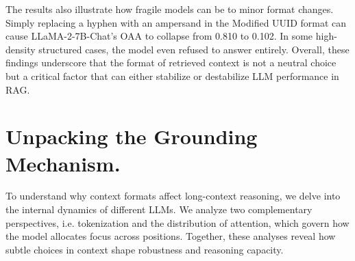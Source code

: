 \documentclass{article} %
\newcommand{\llamachat}{LLaMA-2-7B-Chat}
\begin{document}
The results also illustrate how fragile models can be to minor format changes. Simply replacing a hyphen with an ampersand in the Modified UUID format can cause \llamachat{}’s OAA to collapse from 0.810 to 0.102. In some high-density structured cases, the model even refused to answer entirely.
Overall, these findings underscore that the format of retrieved context is not a neutral choice but a critical factor that can either stabilize or destabilize LLM performance in RAG.

\section{Unpacking the Grounding Mechanism.}
To understand why context formats affect long-context reasoning, we delve into the internal dynamics of different LLMs. 
We analyze two complementary perspectives, i.e. tokenization and the distribution of attention, which govern how the model allocates focus across positions. 
Together, these analyses reveal how subtle choices in context shape robustness and reasoning capacity.  
\end{document}

